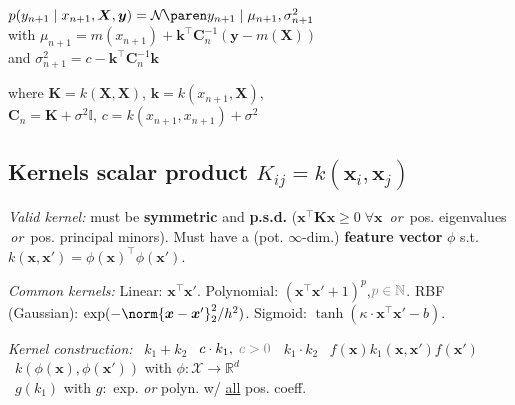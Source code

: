 $p(y_{n+1} \mid x_{n+1}, \bm X, \bm y) = \Gauss{y_{n+1} \mid \mu_{n+1}, \sigma_{n+1}^2}$\\\enskip
with $\mu_{n+1} = m(x_{n+1}) + \bm k^\top \bm C_n^{-1} (\bm y - m(\bm X))$\\\enskip
and $\sigma_{n+1}^2 = c - \bm k^\top \bm C_n^{-1} \bm k$

where
$\bm K = k(\bm X, \bm X)$,\enskip
$\bm k = k(x_{n+1}, \bm X)$,\\
\phantom{where}
$\bm C_n = \bm K + \sigma^2 \mathbb I$,\enskip
$c = k(x_{n+1}, x_{n+1}) + \sigma^2$

\subsection{Kernels \normalfont\sffamily
\quad scalar product
\quad $K_{ij} = k(\bm x_i, \bm x_j)$}

\emph{Valid kernel:}
must be
\textbf{symmetric}
and \textbf{p.s.d.}
    ($\bm x^\top \bm{Kx} \geq 0 \; \forall\bm x$ \textit{\,or\,}
    pos. eigenvalues \textit{\,or\,}
    pos. principal minors).\enskip
Must have a (pot. $\infty$-dim.) \textbf{feature vector} $\phi$ s.t. $k(\bm x, \bm x') = \phi(\bm x)^\top \phi(\bm x')$.

\emph{Common kernels:}
    Linear: $\bm x^\top \bm x'$.
    Polynomial:  $(\bm x^\top \bm x' + 1)^p$,\enskip $\color{gray} p\in\mathbb N$.
    RBF (Gaussian):  $\exp(-\norm{\bm x - \bm x'}_2^2 / h^2)$.
    Sigmoid:  $\tanh(\kappa \cdot \bm x^\top \bm x' - b)$.


\emph{Kernel construction:}
\enskip\textbullet~$k_1 {+} k_2$
\enskip\textbullet~$c\cdot k_1, \; \color{gray} c>0$
\enskip\textbullet~$k_1\cdot k_2$
\enskip\textbullet~$f(\bm x) k_1(\bm x, \bm x') f(\bm x')$
\\\textbullet~$k(\phi(\bm x), \phi(\bm x'))$
    \enskip with $\phi : \mathcal X \to \mathbb R^d$
\\\textbullet~$g(k_1)$
    \enskip with $g :$ exp. \textit{ or } polyn. w/ \underline{all} pos. coeff.

